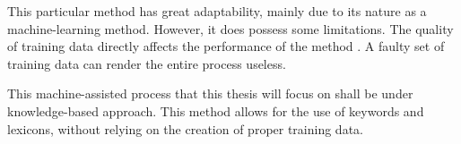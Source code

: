 This particular method has great adaptability, mainly due to its nature as a machine-learning method. However, it does possess some limitations. The quality of training data directly affects the performance of the method \cite{bibpro}. A faulty set of training data can render the entire process useless. 

	This machine-assisted process that this thesis will focus on shall be under knowledge-based approach. This method allows for the use of keywords and lexicons, without relying on the creation of proper training data. 
